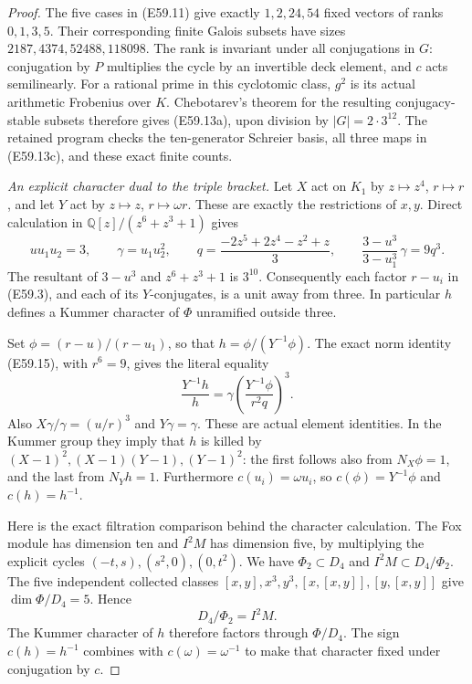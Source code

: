 \begin{proof}
The five cases in (E59.11) give exactly
$1,2,24,54$ fixed vectors of ranks
$0,1,3,5$. Their corresponding finite
Galois subsets have sizes
$2187,4374,52488,118098$.
The rank is invariant under all
conjugations in $G$: conjugation by
$P$ multiplies the cycle by an
invertible deck element, and $c$
acts semilinearly. For a rational
prime in this cyclotomic class,
$g^2$ is its actual arithmetic
Frobenius over $K$.
Chebotarev's theorem for the resulting
conjugacy-stable subsets
\cite[VIII, Theorem 7.4]{E_MilneCFT}
therefore gives (E59.13a), upon
division by $|G|=2\cdot3^{12}$.
The retained program checks the
ten-generator Schreier basis, all
three maps in (E59.13c), and these
exact finite counts.

\emph{An explicit character dual to the triple bracket.}
Let $X$ act on $K_1$ by $z\mapsto z^4$,
$r\mapsto r$, and let $Y$ act by
$z\mapsto z$, $r\mapsto\omega r$.
These are exactly the restrictions of
$x,y$. Direct calculation in
$\mathbb Q[z]/(z^6+z^3+1)$ gives
\[
 u u_1u_2=3,\qquad
 \gamma=u_1u_2^2,\qquad
 q=\frac{-2z^5+2z^4-z^2+z}{3},
 \qquad
 \frac{3-u^3}{3-u_1^3}\,\gamma=9q^3.
 \tag{E59.15}
\]
The resultant of $3-u^3$ and $z^6+z^3+1$
is $3^{10}$.
Consequently each factor $r-u_i$ in
(E59.3), and each of its $Y$-conjugates,
is a unit away from three.
In particular $h$ defines a Kummer
character of $\Phi$ unramified outside
three.

Set $\phi=(r-u)/(r-u_1)$, so that
$h=\phi/(Y^{-1}\phi)$.
The exact norm identity (E59.15), with
$r^6=9$, gives the literal equality
\[
 \frac{Y^{-1}h}{h}
       =\gamma
          \left(\frac{Y^{-1}\phi}{r^2q}\right)^3.
 \tag{E59.16}
\]
Also $X\gamma/\gamma=(u/r)^3$ and
$Y\gamma=\gamma$. These are actual
element identities. In the Kummer group
they imply that $h$ is killed by
$(X-1)^2,(X-1)(Y-1),(Y-1)^2$:
the first follows also from $N_X\phi=1$,
and the last from $N_Yh=1$.
Furthermore $c(u_i)=\omega u_i$, so
$c(\phi)=Y^{-1}\phi$ and $c(h)=h^{-1}$.

Here is the exact filtration comparison
behind the character calculation.
The Fox module has dimension ten and
$I^2M$ has dimension five, by multiplying
the explicit cycles
$(-t,s),(s^2,0),(0,t^2)$.
We have $\Phi_2\subset D_4$ and
$I^2M\subset D_4/\Phi_2$.
The five independent collected classes
$[x,y],x^3,y^3,[x,[x,y]],[y,[x,y]]$
give $\dim\Phi/D_4=5$.
Hence
\[
                 D_4/\Phi_2=I^2M.
 \tag{E59.17}
\]
The Kummer character of $h$ therefore
factors through $\Phi/D_4$.
The sign $c(h)=h^{-1}$ combines with
$c(\omega)=\omega^{-1}$ to make that
character fixed under conjugation by $c$.


\end{proof}
